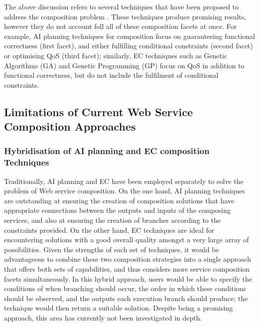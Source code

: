 The above discussion refers to several techniques that have been proposed to address the composition problem \cite{rao2005survey}. These techniques produce promising results,
however they do not account foll all of these composition facets at once. For example, AI planning techniques for composition \cite{huang2009effective,deng2013efficient} focus on guaranteeing functional correctness (first facet), and either fulfilling conditional constraints (second facet) or optimising QoS (third facet); similarly, EC techniques such as Genetic Algorithms (GA) and Genetic Programming (GP) \cite{rodriguez2010composition,wang2012survey} focus on QoS in addition to functional correctness, but do not include the fulfilment of conditional constraints.

\subsection{Limitations of Current Web Service Composition Approaches}

\subsubsection{Hybridisation of AI planning and EC composition Techniques}
Traditionally, AI planning and EC have been employed separately to solve the problem of Web service composition. On the one hand, AI planning techniques are outstanding at ensuring the creation of composition solutions that have appropriate connections between the outputs and inputs of the composing services, and also at ensuring the creation of branches according to the constraints provided. On the other hand, EC techniques are ideal for encountering solutions with a good overall quality amongst a very large array of possibilities. Given the strengths of each set of techniques, it would be advantageous to combine these two composition strategies into a single approach that offers both sets of capabilities, and thus considers more service composition facets simultaneously. In this hybrid approach, users would be able to specify the conditions of when branching should occur, the order in which these conditions should be observed, and the outputs each execution branch should produce; the technique would then return a suitable solution. Despite being a promising approach, this area has currently not been investigated in depth.

